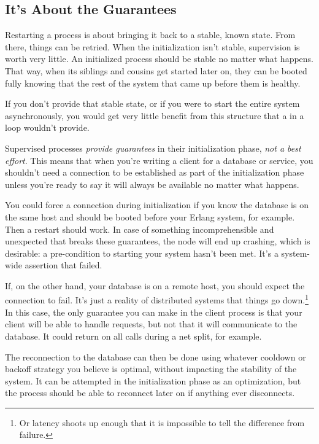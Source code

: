 \subsection{It's About the Guarantees}
\label{subsec:start-link-guarantees}

Restarting a process is about bringing it back to a stable, known state. From there, things can be retried. When the initialization isn't stable, supervision is worth very little. An initialized process should be stable no matter what happens. That way, when its siblings and cousins get started later on, they can be booted fully knowing that the rest of the system that came up before them is healthy.

If you don't provide that stable state, or if you were to start the entire system asynchronously, you would get very little benefit from this structure that a  in a loop wouldn't provide.

Supervised processes \emph{provide guarantees} in their initialization phase, \emph{not a best effort}. This means that when you're writing a client for a database or service, you shouldn't need a connection to be established as part of the initialization phase unless you're ready to say it will always be available no matter what happens.

You could force a connection during initialization if you know the database is on the same host and should be booted before your Erlang system, for example. Then a restart should work. In case of something incomprehensible and unexpected that breaks these guarantees, the node will end up crashing, which is desirable: a pre-condition to starting your system hasn't been met. It's a system-wide assertion that failed.

If, on the other hand, your database is on a remote host, you should expect the connection to fail. It's just a reality of distributed systems that things go down.\footnote{Or latency shoots up enough that it is impossible to tell the difference from failure.} In this case, the only guarantee you can make in the client process is that your client will be able to handle requests, but not that it will communicate to the database. It could return  on all calls during a net split, for example.

The reconnection to the database can then be done using whatever cooldown or backoff strategy you believe is optimal, without impacting the stability of the system. It can be attempted in the initialization phase as an optimization, but the process should be able to reconnect later on if anything ever disconnects.

